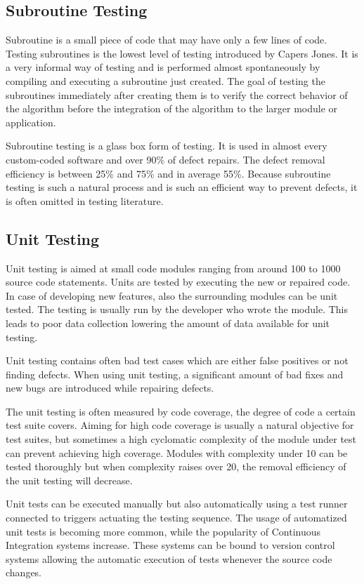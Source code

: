  \subsection{Subroutine Testing}

 Subroutine is a small piece of code that may have only a few lines of code. Testing subroutines is the lowest level of testing introduced by Capers Jones. It is a very informal way of testing and is performed almost spontaneously by compiling and executing a subroutine just created. The goal of testing the subroutines immediately after creating them is to verify the correct behavior of the algorithm before the integration of the algorithm to the larger module or application.

 Subroutine testing is a glass box form of testing. It is used in almost every custom-coded software and over 90\% of defect repairs. The defect removal efficiency is between 25\% and 75\% and in average 55\%. Because subroutine testing is such a natural process and is such an efficient way to prevent defects, it is often omitted in testing literature.

 \subsection{Unit Testing}

 Unit testing is aimed at small code modules ranging from around 100 to 1000 source code statements. Units are tested by executing the new or repaired code. In case of developing new features, also the surrounding modules can be unit tested. The testing is usually run by the developer who wrote the module. This leads to poor data collection lowering the amount of data available for unit testing.

 Unit testing contains often bad test cases which are either false positives or not finding defects. When using unit testing, a significant amount of bad fixes and new bugs are introduced while repairing defects.

 The unit testing is often measured by code coverage, the degree of code a certain test suite covers. Aiming for high code coverage is usually a natural objective for test suites, but sometimes a high cyclomatic complexity of the module under test can prevent achieving high coverage. Modules with complexity under 10 can be tested thoroughly but when complexity raises over 20, the removal efficiency of the unit testing will decrease.

 Unit tests can be executed manually but also automatically using a test runner connected to triggers actuating the testing sequence. The usage of automatized unit tests is becoming more common, while the popularity of Continuous Integration systems increase. These systems can be bound to version control systems allowing the automatic execution of tests whenever the source code changes.

